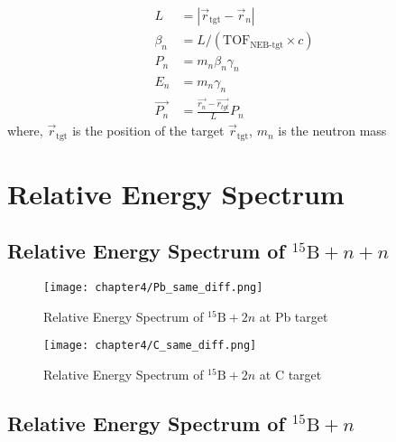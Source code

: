 \begin{align}
    L &= | \vec{r}_{\text{tgt}} - \vec{r}_{n} | \\
    \beta_{n} &= L / (\text{TOF}_{\text{NEB-tgt}} \times c) \\
    P_{n} &= m_{n} \beta_{n} \gamma_{n} \\
    E_{n} &= m_{n} \gamma_{n} \\
    \vec{P_{n}} &= \frac{\vec{r_{n}} - \vec{r_{tgt}}}{L} P_{n}
\end{align}
where, $\vec{r}_{\text{tgt}}$ is the position of the target $\vec{r}_{\text{tgt}}$, $m_{n}$ is the neutron mass


\section{Relative Energy Spectrum}
\subsection{Relative Energy Spectrum of ${}^{15}\text{B} + n + n$}

\begin{figure}[h]
    \centering
    \texttt{[image: chapter4/Pb\_same\_diff.png]}
    \caption{Relative Energy Spectrum of ${}^{15}\text{B} + 2n$ at Pb target}
\end{figure}
\begin{figure}[h]
    \centering
    \texttt{[image: chapter4/C\_same\_diff.png]}
    \caption{Relative Energy Spectrum of ${}^{15}\text{B} + 2n$ at C target}
\end{figure}


\subsection{Relative Energy Spectrum of ${}^{15}\text{B} + n$}
